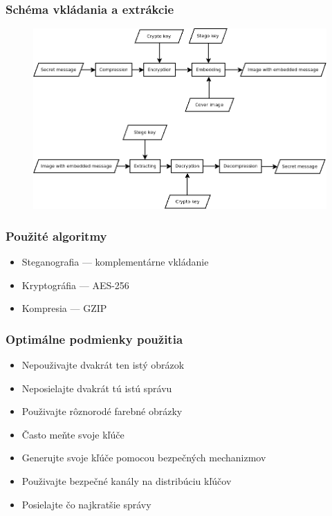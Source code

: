 \documentclass{beamer}
\begin{document}
\begin{frame}
    \frametitle{Schéma vkládania a extrákcie}
    \begin{figure}
    \centerline{\includegraphics[width=\textwidth]{diagrams/flow.png}}
    \label{img:CSflow}
    \end{figure}
    
\end{frame}

\begin{frame}
    \frametitle{Použité algoritmy}
    \begin{itemize}
        \item Steganografia --- komplementárne vkládanie
        \item Kryptográfia --- AES-256
        \item Kompresia --- GZIP
    \end{itemize}
    
\end{frame}

\begin{frame}
    \frametitle{Optimálne podmienky použitia}
    \begin{itemize}
        \item Nepouživajte dvakrát ten istý obrázok
        \item Neposielajte dvakrát tú istú správu
        \item Použivajte rôznorodé farebné obrázky
        \item Často meňte svoje kľúče
        \item Generujte svoje kľúče pomocou bezpečných mechanizmov
        \item Použivajte bezpečné kanály na distribúciu kľúčov
        \item Posielajte čo najkratšie správy
    \end{itemize}
\end{frame}
\end{document}
